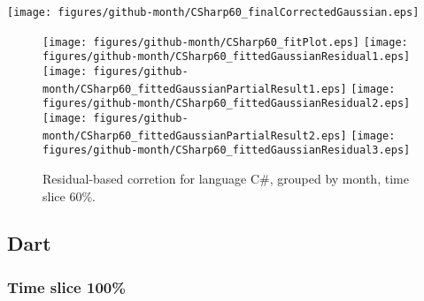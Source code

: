 \begin{center}
{\texttt{[image: figures/github-month/CSharp60\_finalCorrectedGaussian.eps]}}
\end{center}

\FloatBarrier

\begin{figure}[t]
\centering
{}
{\texttt{[image: figures/github-month/CSharp60\_fitPlot.eps]}}
{\texttt{[image: figures/github-month/CSharp60\_fittedGaussianResidual1.eps]}}
{\texttt{[image: figures/github-month/CSharp60\_fittedGaussianPartialResult1.eps]}}
{\texttt{[image: figures/github-month/CSharp60\_fittedGaussianResidual2.eps]}}
{\texttt{[image: figures/github-month/CSharp60\_fittedGaussianPartialResult2.eps]}}
{\texttt{[image: figures/github-month/CSharp60\_fittedGaussianResidual3.eps]}}
\caption{Residual-based corretion for language C\#, grouped by month, time slice 60\%.}
\end{figure}


\FloatBarrier


\subsection{Dart}

\subsubsection{Time slice 100\%}


